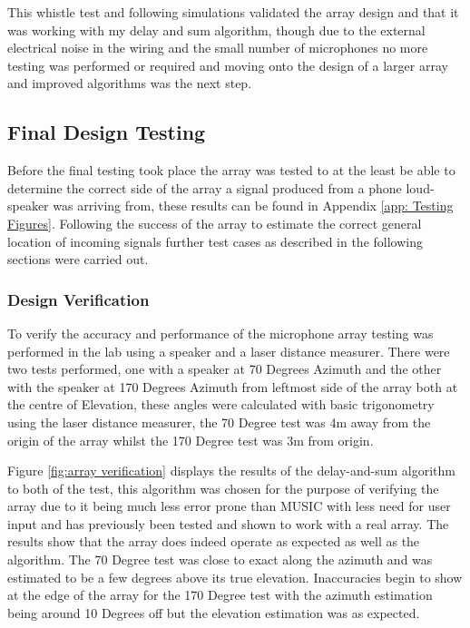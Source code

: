 \documentclass{UoNMCHA}
\numberwithin{equation}{section}
\begin{document}
    This whistle test and following simulations validated the array design and that it was working with my delay and sum algorithm, though due to the external electrical noise in the wiring and the small number of microphones no more testing was performed or required and moving onto the design of a larger array and improved algorithms was the next step.
    
\newpage
\subsection{Final Design Testing} \label{sec:Second Array Testing}
    Before the final testing took place the array was tested to at the least be able to determine the correct side of the array a signal produced from a phone loud-speaker was arriving from, these results can be found in Appendix \ref{app: Testing Figures}. Following the success of the array to estimate the correct general location of incoming signals further test cases as described in the following sections were carried out.
\subsubsection{Design Verification} \label{sec:Design Verification Testing}
    To verify the accuracy and performance of the microphone array testing was performed in the lab using a speaker and a laser distance measurer. There were two tests performed, one with a speaker at 70 Degrees Azimuth and the other with the speaker at 170 Degrees Azimuth from leftmost side of the array both at the centre of Elevation, these angles were calculated with basic trigonometry using the laser distance measurer, the 70 Degree test was 4m away from the origin of the array whilst the 170 Degree test was 3m from origin.

    Figure \ref{fig:array verification} displays the results of the delay-and-sum algorithm to both of the test, this algorithm was chosen for the purpose of verifying the array due to it being much less error prone than MUSIC with less need for user input and has previously been tested and shown to work with a real array. The results show that the array does indeed operate as expected as well as the algorithm. The 70 Degree test was close to exact along the azimuth and was estimated to be a few degrees above its true elevation. Inaccuracies begin to show at the edge of the array for the 170 Degree test with the azimuth estimation being around 10 Degrees off but the elevation estimation was as expected.
    
\end{document}

